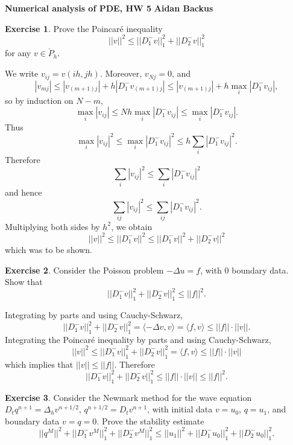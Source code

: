 \documentclass[10pt]{article}
\theoremstyle{definition}
\newtheorem{exer}{Exercise}
\begin{document}
\noindent
\large\textbf{Numerical analysis of PDE, HW 5} \hfill \textbf{Aidan Backus} \\

\begin{exer}
Prove the Poincar\'e inequality
$$||v||^2 \leq ||D_1^- v||_1^2 + ||D_2^- v||_1^2$$
for any $v \in \mathring P_h$.
\end{exer}

We write $v_{ij} = v(ih, jh)$.
Moreover, $v_{Nj} = 0$, and
$$|v_{mj}| \leq |v_{(m+1)j}| + h|D_1^- v_{(m+1)j}| \leq |v_{(m+1)j}| + h\max_i |D_1^- v_{ij}|,$$
so by induction on $N - m$,
$$\max_i |v_{ij}| \leq Nh \max_i |D_1^- v_{ij}| \leq \max_i |D_1^- v_{ij}|.$$
Thus
$$\max_i |v_{ij}|^2 \leq \max_i |D_1^- v_{ij}|^2 \leq h\sum_i |D_1^- v_{ij}|^2.$$
Therefore
$$\sum_i |v_{ij}|^2 \leq \sum_i |D_1^- v_{ij}|^2$$
and hence
$$\sum_{ij} |v_{ij}|^2 \leq \sum_{ij} |D_1^- v_{ij}|^2.$$
Multiplying both sides by $h^2$, we obtain
$$||v||^2 \leq ||D_1^- v||^2 \leq ||D_1^- v||^2 + ||D_2^- v||^2$$
which was to be shown.

\begin{exer}
Consider the Poisson problem $-\Delta u = f$, with $0$ boundary data.
Show that
$$||D_1^- v||_1^2 + ||D_2^- v||_1^2 \leq ||f||^2.$$
\end{exer}

Integrating by parts and using Cauchy-Schwarz,
$$||D_1^- v||_1^2 + ||D_2^- v||_1^2 = \langle -\Delta v, v\rangle = \langle f, v\rangle \leq ||f|| \cdot ||v||.$$
Integrating the Poincar\'e inequality by parts and using Cauchy-Schwarz,
$$||v||^2 \leq ||D_1^- v||_1^2 + ||D_2^- v||_1^2 = \langle f, v\rangle \leq ||f|| \cdot ||v||$$
which implies that $||v|| \leq ||f||$. Therefore
$$||D_1^- v||_1^2 + ||D_2^- v||_1^2 \leq ||f|| \cdot ||v|| \leq ||f||^2.$$

\begin{exer}
Consider the Newmark method for the wave equation $D_t q^{n+1} = \Delta_h v^{n + 1/2}$, $q^{n + 1/2} = D_t v^{n + 1}$, with initial data $v = u_0$, $q = u_1$, and boundary data $v = q = 0$.
Prove the stability estimate
$$||q^M||^2 + ||D_1^- v^M||_1^2 + ||D_2^- v^M||_1^2 \leq ||u_1||^2 + ||D_1^- u_0||_1^2 + ||D_2^- u_0||_1^2.$$
\end{exer}
\end{document}
